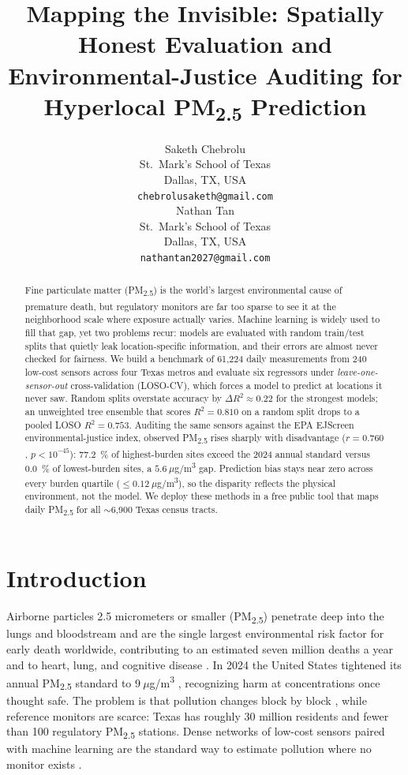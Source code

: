 \documentclass{article}
\title{Mapping the Invisible: Spatially Honest Evaluation and Environmental-Justice Auditing for Hyperlocal PM\textsubscript{2.5} Prediction}
\author{%
  Saketh Chebrolu \\
  St.~Mark's School of Texas \\
  Dallas, TX, USA \\
  \texttt{chebrolusaketh@gmail.com} \\
  \And
  Nathan Tan \\
  St.~Mark's School of Texas \\
  Dallas, TX, USA \\
  \texttt{nathantan2027@gmail.com} \\
}
\begin{document}
\maketitle

\begin{abstract}
Fine particulate matter (PM\textsubscript{2.5}) is the world's largest environmental cause of premature death, but regulatory monitors are far too sparse to see it at the neighborhood scale where exposure actually varies. Machine learning is widely used to fill that gap, yet two problems recur: models are evaluated with random train/test splits that quietly leak location-specific information, and their errors are almost never checked for fairness. We build a benchmark of 61{,}224 daily measurements from 240 low-cost sensors across four Texas metros and evaluate six regressors under \emph{leave-one-sensor-out} cross-validation (LOSO-CV), which forces a model to predict at locations it never saw. Random splits overstate accuracy by $\Delta R^2 \approx 0.22$ for the strongest models; an unweighted tree ensemble that scores $R^2{=}0.810$ on a random split drops to a pooled LOSO $R^2{=}0.753$. Auditing the same sensors against the EPA EJScreen environmental-justice index, observed PM\textsubscript{2.5} rises sharply with disadvantage ($r{=}0.760$, $p{<}10^{-45}$): \SI{77.2}{\percent} of highest-burden sites exceed the 2024 annual standard versus \SI{0.0}{\percent} of lowest-burden sites, a $5.6~\mu$g/m\textsuperscript{3} gap. Prediction bias stays near zero across every burden quartile ($\le\!0.12~\mu$g/m\textsuperscript{3}), so the disparity reflects the physical environment, not the model. We deploy these methods in a free public tool that maps daily PM\textsubscript{2.5} for all $\sim$6{,}900 Texas census tracts.
\end{abstract}

\section{Introduction}

Airborne particles 2.5 micrometers or smaller (PM\textsubscript{2.5}) penetrate deep into the lungs and bloodstream and are the single largest environmental risk factor for early death worldwide, contributing to an estimated seven million deaths a year and to heart, lung, and cognitive disease \citep{who2024ambient, pope2006health, landrigan2018lancet}. In 2024 the United States tightened its annual PM\textsubscript{2.5} standard to $9~\mu$g/m\textsuperscript{3} \citep{epa2024naaqs}, recognizing harm at concentrations once thought safe. The problem is that pollution changes block by block \citep{apte2017diesel, messier2018}, while reference monitors are scarce: Texas has roughly 30 million residents and fewer than 100 regulatory PM\textsubscript{2.5} stations. Dense networks of low-cost sensors paired with machine learning are the standard way to estimate pollution where no monitor exists \citep{ghahremanloo2021, zhang2024unmasking}.
\end{document}
